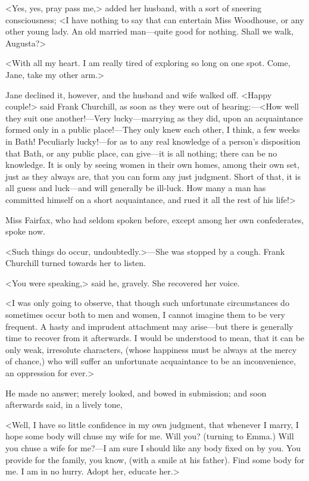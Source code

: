 <Yes, yes, pray pass me,> added her husband, with a sort of sneering consciousness; <I have nothing to say that can entertain Miss Woodhouse, or any other young lady. An old married man—quite good for nothing. Shall we walk, Augusta?>

<With all my heart. I am really tired of exploring so long on one spot. Come, Jane, take my other arm.>

Jane declined it, however, and the husband and wife walked off. <Happy couple!> said Frank Churchill, as soon as they were out of hearing:—<How well they suit one another!—Very lucky—marrying as they did, upon an acquaintance formed only in a public place!—They only knew each other, I think, a few weeks in Bath! Peculiarly lucky!—for as to any real knowledge of a person's disposition that Bath, or any public place, can give—it is all nothing; there can be no knowledge. It is only by seeing women in their own homes, among their own set, just as they always are, that you can form any just judgment. Short of that, it is all guess and luck—and will generally be ill-luck. How many a man has committed himself on a short acquaintance, and rued it all the rest of his life!>

Miss Fairfax, who had seldom spoken before, except among her own confederates, spoke now.

<Such things do occur, undoubtedly.>—She was stopped by a cough. Frank Churchill turned towards her to listen.

<You were speaking,> said he, gravely. She recovered her voice.

<I was only going to observe, that though such unfortunate circumstances do sometimes occur both to men and women, I cannot imagine them to be very frequent. A hasty and imprudent attachment may arise—but there is generally time to recover from it afterwards. I would be understood to mean, that it can be only weak, irresolute characters, (whose happiness must be always at the mercy of chance,) who will suffer an unfortunate acquaintance to be an inconvenience, an oppression for ever.>

He made no answer; merely looked, and bowed in submission; and soon afterwards said, in a lively tone,

<Well, I have so little confidence in my own judgment, that whenever I marry, I hope some body will chuse my wife for me. Will you? (turning to Emma.) Will you chuse a wife for me?—I am sure I should like any body fixed on by you. You provide for the family, you know, (with a smile at his father). Find some body for me. I am in no hurry. Adopt her, educate her.>

